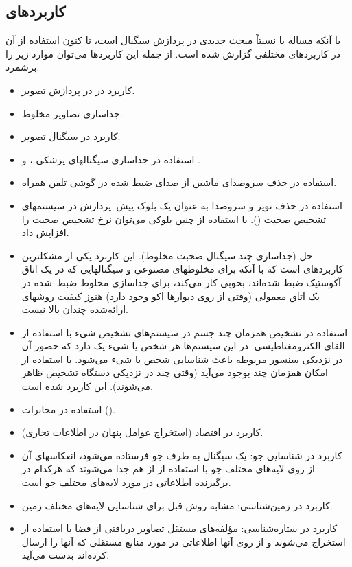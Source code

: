 \subsection{کاربردهای }
با آنکه مساله  یا  نسبتاً مبحث جدیدی در پردازش سیگنال است، تا
کنون استفاده از آن در کاربردهای مختلفی گزارش شده است. از جمله این
کاربردها می‌توان موارد زیر را برشمرد:
\begin{itemize}
\item کاربرد در   در پردازش تصویر.

\item جداسازی تصاویر مخلوط.

\item کاربرد در  سیگنال تصویر.

\item استفاده در جداسازی سیگنالهای پزشکی ،   و .

\item استفاده در حذف سروصدای ماشین از صدای ضبط شده در گوشی تلفن همراه.

\item استفاده در حذف نویز و سروصدا به عنوان یک بلوک پیش~پردازش در
سیستمهای تشخیص صحبت (). با استفاده از چنین بلوکی می‌توان 
نرخ تشخیص صحبت را افزایش داد.

\item حل   (جداسازی چند سیگنال صحبت مخلوط). این
کاربرد یکی از مشکلترین کاربردهای   است که با آنکه برای مخلوطهای
مصنوعی و سیگنالهایی که در یک اتاق آکوستیک ضبط شده‌اند، بخوبی کار
می‌کند، برای جداسازی مخلوط ضبط~شده در یک اتاق معمولی (وقتی از
روی دیوارها اکو وجود دارد) هنوز کیفیت روشهای ارائه‌شده چندان بالا
نیست.

\item استفاده در تشخیص همزمان چند جسم در سیستم‌های تشخیص شیء 
با استفاده از القای الکترومغناطیسی. در این سیستم‌ها هر شخص یا
شیء یک   دارد که حضور آن در نزدیکی سنسور مربوطه باعث
شناسایی شخص یا شیء می‌شود. با استفاده از   امکان
 همزمان چند   بوجود می‌آید (وقتی چند   در
نزدیکی دستگاه تشخیص ظاهر می‌شوند). این کاربرد   شده است.

\item استفاده در مخابرات ().

\item کاربرد در اقتصاد (استخراج عوامل پنهان در اطلاعات تجاری).

\item کاربرد در شناسایی جو: یک سیگنال به طرف جو فرستاده می‌شود،
انعکاسهای آن از روی لایه‌های مختلف جو با استفاده از   از هم جدا
می‌شوند که هرکدام در برگیرنده اطلاعاتی در مورد لایه‌های مختلف جو
است.

\item کاربرد در زمین‌شناسی: مشابه روش قبل برای شناسایی لایه‌های مختلف زمین.

\item کاربرد در ستاره‌شناسی: مؤلفه‌های مستقل تصاویر دریافتی از فضا با استفاده 
از   استخراج می‌شوند و از روی آنها اطلاعاتی در مورد منابع
مستقلی که آنها را ارسال کرده‌اند بدست می‌آید.
\end{itemize}

